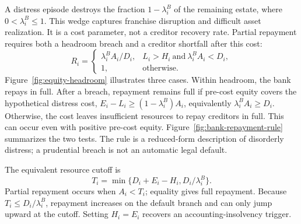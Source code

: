 A distress episode destroys the fraction $1-\lambda_i^B$ of the remaining estate, where $0<\lambda_i^B\leq1$. This wedge captures franchise disruption and difficult asset realization. It is a cost parameter, not a creditor recovery rate. Partial repayment requires both a headroom breach and a creditor shortfall after this cost:
\begin{equation}
 R_i=\begin{cases}
 \lambda_i^B A_i/D_i,&L_i>H_i\ \text{and}\ \lambda_i^B A_i<D_i,\\
 1,&\text{otherwise}.
 \end{cases}
 \label{eq:bank_repayment}
\end{equation}
Figure~\ref{fig:equity-headroom} illustrates three cases. Within headroom, the bank repays in full. After a breach, repayment remains full if pre-cost equity covers the hypothetical distress cost, $E_i-L_i\geq(1-\lambda_i^B)A_i$, equivalently $\lambda_i^B A_i\geq D_i$. Otherwise, the cost leaves insufficient resources to repay creditors in full. This can occur even with positive pre-cost equity. Figure~\ref{fig:bank-repayment-rule} summarizes the two tests. The rule is a reduced-form description of disorderly distress; a prudential breach is not an automatic legal default.



The equivalent resource cutoff is
\[
 T_i=\min\{D_i+E_i-H_i,D_i/\lambda_i^B\}.
\]
Partial repayment occurs when $A_i<T_i$; equality gives full repayment. Because $T_i\leq D_i/\lambda_i^B$, repayment increases on the default branch and can only jump upward at the cutoff. Setting $H_i=E_i$ recovers an accounting-insolvency trigger.

